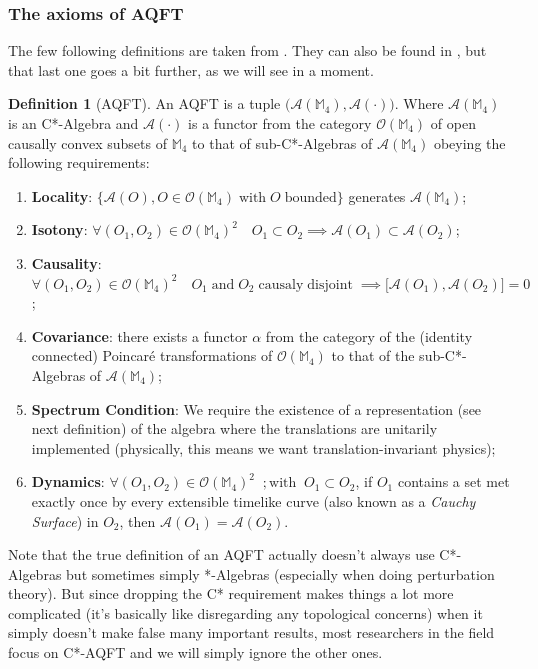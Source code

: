 \documentclass[a4paper,11pt]{article}
\numberwithin{equation}{section}
\theoremstyle{definition}
\newtheorem{definition}{Definition}
\begin{document}
\subsubsection{The axioms of AQFT}
The few following definitions are taken from \cite{AQFT_Intro}. They can also be found in \cite{pAQFT}, but that last one goes a bit further, as we will see in a moment.
\begin{definition}[AQFT] \label{AQFT_M4-Ax}
    An AQFT is a tuple $\big(\mathcal{A}(\mathbb{M}_4), \mathcal{A}(\cdot)\big)$. Where $\mathcal{A}(\mathbb{M}_4)$ is an C*-Algebra and $\mathcal{A}(\cdot)$ is a functor from the category $\mathcal{O}(\mathbb{M}_4)$ of open causally convex subsets of $\mathbb{M}_4$ to that of sub-C*-Algebras of $\mathcal{A}(\mathbb{M}_4)$ obeying the following requirements:
    \begin{enumerate}
        \item \textbf{Locality}:  $\big\{\mathcal{A}(O), O \in \mathcal{O}(\mathbb{M}_4) \; \mathrm{with}\; O\; \mathrm{bounded}\big\}$ generates $\mathcal{A}(\mathbb{M}_4)$;
        \item \textbf{Isotony}: $\forall (O_1, O_2) \in \mathcal{O}(\mathbb{M}_4)^2 \quad O_1\subset O_2 \implies \mathcal{A}(O_1)\subset\mathcal{A}(O_2)$;
        \item \textbf{Causality}: $\forall (O_1, O_2) \in \mathcal{O}(\mathbb{M}_4)^2 \quad O_1 \; \mathrm{and}\; O_2\; \mathrm{causaly}\;\mathrm{disjoint}\; \implies \big[\mathcal{A}(O_1),\mathcal{A}(O_2)\big]=0$;
        \item \textbf{Covariance}: there exists a functor $\alpha$ from the category of the (identity connected) Poincaré transformations of $\mathcal{O}(\mathbb{M}_4)$ to that of the sub-C*-Algebras of $\mathcal{A}(\mathbb{M}_4)$;
        \item \textbf{Spectrum Condition}: We require the existence of a representation (see next definition) of the algebra where the translations are unitarily implemented (physically, this means we want translation-invariant physics);
        \item \textbf{Dynamics}: $\forall (O_1, O_2) \in \mathcal{O}(\mathbb{M}_4)^2 \;\;;\mathrm{with} \;\;O_1 \subset O_2$, if $O_1$ contains a set met exactly once by every extensible timelike curve (also known as a \emph{Cauchy Surface}) in $O_2$, then $\mathcal{A}(O_1)=\mathcal{A}(O_2)$.
    \end{enumerate}
    
Note that the true definition of an AQFT actually doesn't always use C*-Algebras but sometimes simply *-Algebras (especially when doing perturbation theory). But since dropping the C* requirement makes things a lot more complicated (it's basically like disregarding any topological concerns) when it simply doesn't make false many important results, most researchers in the field focus on C*-AQFT and we will simply ignore the other ones.
\end{definition}
\end{document}
